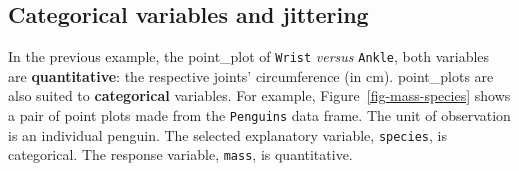 \documentclass[
  letterpaper,
  DIV=11,
  numbers=noendperiod,
  oneside]{scrartcl}
\begin{document}
\subsection{Categorical variables and
jittering}\label{categorical-variables-and-jittering}

In the previous example, the point\_plot of \texttt{Wrist} \emph{versus}
\texttt{Ankle}, both variables are \textbf{quantitative}: the respective
joints' circumference (in cm). point\_plots are also suited to
\textbf{categorical} variables. For example,
Figure~\ref{fig-mass-species} shows a pair of point plots made from the
\texttt{Penguins} data frame. The unit of observation is an individual
penguin. The selected explanatory variable, \texttt{species}, is
categorical. The response variable, \texttt{mass}, is quantitative.

\begin{figure}

\end{figure}
\end{document}
